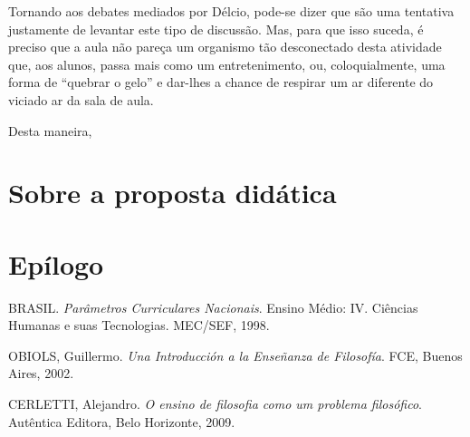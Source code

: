 \documentclass[12pt,a4paper]{article}
\begin{document}
	Tornando aos debates mediados por Délcio, pode-se dizer que são uma 
	tentativa justamente de levantar este tipo de discussão. Mas, para que 
	isso suceda, é preciso que a aula não pareça um organismo tão desconectado 
	desta atividade que, aos alunos, passa mais como um entretenimento, ou, 
	coloquialmente, uma forma de ``quebrar o gelo'' e dar-lhes a chance de 
	respirar um ar diferente do viciado ar da sala de aula. 
	
	Desta maneira, 
	
	\newpage
	
	\section{Sobre a proposta didática}
	
	\newpage
	
	\section{Epílogo}
	
	\newpage
	
    \begin{thebibliography}{9}
		
		BRASIL. 
		\textit{Parâmetros Curriculares Nacionais}.  
		Ensino Médio: IV. Ciências Humanas e suas Tecnologias. 
		MEC/SEF, 1998. 
		
		OBIOLS, Guillermo. 
		\textit{Una Introducción a la Enseñanza de Filosofía}. 
		FCE, Buenos Aires, 2002. 
		
		CERLETTI, Alejandro. 
		\textit{O ensino de filosofia como um problema filosófico}. 
		Autêntica Editora, Belo Horizonte, 2009. 

	\end{thebibliography}
	
\end{document}
